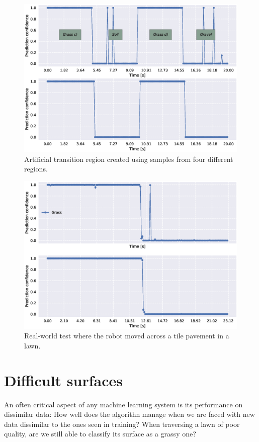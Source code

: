 \begin{figure}
	\centering
	\includegraphics[scale=0.5]{figs_temp/varmats2}
	\caption{Artificial transition region created using samples from four different regions.}
\end{figure}

\begin{figure}
	\centering
	\includegraphics[scale=0.5]{figs_temp/transition_grass_tiles_grass}
	\caption{Real-world test where the robot moved across a tile pavement in a lawn.} 
\end{figure}

\section{Difficult surfaces}

An often critical aspect of any machine learning system is its performance on dissimilar data: How well does the algorithn manage when we are faced with new data dissimilar to the ones seen in training? When traversing a lawn of poor quality, are we still able to classify its surface as a grassy one?  















